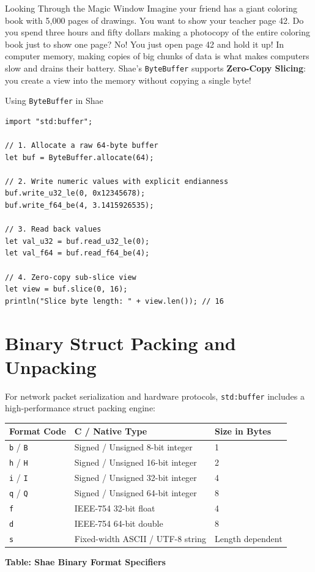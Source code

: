 \begin{kidbox}{Looking Through the Magic Window}
Imagine your friend has a giant coloring book with 5,000 pages of drawings.
You want to show your teacher page 42.
Do you spend three hours and fifty dollars making a photocopy of the entire coloring book just to show one page?
No! You just open page 42 and hold it up!
In computer memory, making copies of big chunks of data is what makes computers slow and drains their battery.
Shae's \texttt{ByteBuffer} supports \textbf{Zero-Copy Slicing}: you create a view into the memory without copying a single byte!
\end{kidbox}

\begin{syntaxbox}{Using \texttt{ByteBuffer} in Shae}
\begin{lstlisting}[language=shaelang]
import "std:buffer";

// 1. Allocate a raw 64-byte buffer
let buf = ByteBuffer.allocate(64);

// 2. Write numeric values with explicit endianness
buf.write_u32_le(0, 0x12345678);
buf.write_f64_be(4, 3.1415926535);

// 3. Read back values
let val_u32 = buf.read_u32_le(0);
let val_f64 = buf.read_f64_be(4);

// 4. Zero-copy sub-slice view
let view = buf.slice(0, 16);
println("Slice byte length: " + view.len()); // 16
\end{lstlisting}
\end{syntaxbox}

\section{Binary Struct Packing and Unpacking}

For network packet serialization and hardware protocols, \texttt{std:buffer} includes a high-performance struct packing engine:

\begin{center}\vspace{8pt}
\centering
\begin{tabular}{lll}
\toprule
\textbf{Format Code} & \textbf{C / Native Type} & \textbf{Size in Bytes} \\
\midrule
\texttt{b} / \texttt{B} & Signed / Unsigned 8-bit integer & 1 \\
\texttt{h} / \texttt{H} & Signed / Unsigned 16-bit integer & 2 \\
\texttt{i} / \texttt{I} & Signed / Unsigned 32-bit integer & 4 \\
\texttt{q} / \texttt{Q} & Signed / Unsigned 64-bit integer & 8 \\
\texttt{f} & IEEE-754 32-bit float & 4 \\
\texttt{d} & IEEE-754 64-bit double & 8 \\
\texttt{s} & Fixed-width ASCII / UTF-8 string & Length dependent \\
\bottomrule
\end{tabular}
\par\vspace{4pt}\small\textbf{Table: Shae Binary Format Specifiers}
\end{center}

